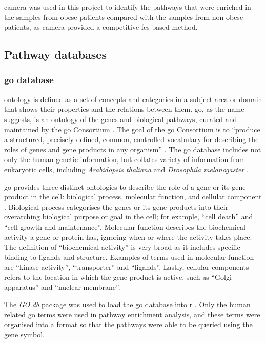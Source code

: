 \gls{camera} was used in this project to identify the pathways that were enriched in the samples from obese patients compared with the samples from non-obese patients, as \gls{camera} provided a competitive \gls{fcs}-based method.

\subsection{Pathway databases}
\label{sub:pathway_databases}

\subsubsection{\gls{go} database}
\label{ssub:go_database}

\Gls{ontology} is defined as a set of concepts and categories in a subject area or domain that shows their properties and the relations between them.
\Acrfull{go}, as the name suggests, is an \gls{ontology} of the genes and biological pathways, curated and maintained by the \gls{go} Consortium \citep{GO2000,GO2004}.
The goal of the \gls{go} Consortium is to ``produce a structured, precisely defined, common, controlled vocabulary for describing the roles of genes and gene products in any organism'' \citep{GO2000}.
The \gls{go} database includes not only the human genetic information, but collates variety of information from eukaryotic cells, including \textit{Arabidopsis thaliana} and \textit{Drosophila melanogaster} \citep{GO2000,GO2004}.

\gls{go} provides three distinct ontologies to describe the role of a gene or its gene product in the cell: biological process, molecular function, and cellular component \citep{GO2000}.
Biological process categorises the genes or its gene products into their overarching biological purpose or goal in the cell; for example, ``cell death'' and ``cell growth and maintenance''.
Molecular function describes the biochemical activity a gene or protein has, ignoring when or where the activity takes place.
The definition of ``biochemical activity'' is very broad as it includes specific binding to ligands and structure.
Examples of terms used in molecular function are ``kinase activity'', ``transporter'' and ``ligands''.
Lastly, cellular components refers to the location in which the gene product is active, such as ``Golgi apparatus'' and ``nuclear membrane''.

The \textit{GO.db} package was used to load the \gls{go} database into \gls{r} \citep{Carlson2016}.
Only the human related \gls{go} terms were used in pathway enrichment analysis, and these terms were organised into a format so that the pathways were able to be queried using the gene symbol.

